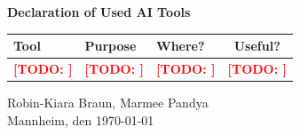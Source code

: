 \documentclass[a4paper,oneside,bibliography=totoc]{scrartcl}
\newcommand{\todo}[1]{\textcolor{red}{\textbf{[TODO: #1]}}}
\begin{document}
\begin{center}
  \textbf{Declaration of Used AI Tools} \\[.3em]
  \begin{tabularx}{\textwidth}{lXlc}
    \toprule
    Tool & Purpose & Where? & Useful? \\
    \midrule
    \todo{} & \todo{} & \todo{} & \todo{} \\
    \bottomrule
  \end{tabularx}
\end{center}

\vspace{2cm}
\noindent Robin-Kiara Braun, Marmee Pandya \\
\noindent Mannheim, den {\today}
\end{document}
